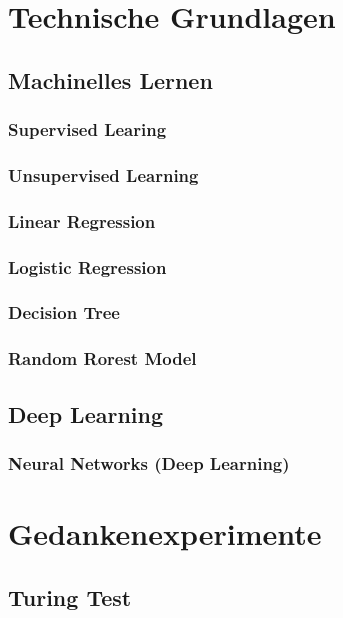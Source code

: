 \documentclass[12pt,german,ngerman]{report}
\begin{document}
    \chapter{Technische Grundlagen}

    \section{Machinelles Lernen}
    \subsection{Supervised Learing}
    \subsection{Unsupervised Learning}
    \subsection{Linear Regression}
    \subsection{Logistic Regression}
    \subsection{Decision Tree}
    \subsection{Random Rorest Model}

    \section{Deep Learning}
    \subsection{Neural Networks (Deep Learning)}

    \chapter{Gedankenexperimente}


    \section{Turing Test}
    \autocite{turing1950computing}
\end{document}
